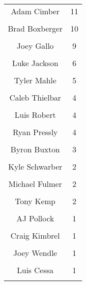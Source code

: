 \begin{table}
\begin{tabular}[t]{|>{}c|>{}c|}
\hline
\cellcolor{gray!6}{Freddy Peralta} & \cellcolor{gray!6}{12}\\
\hline
Adam Cimber & 11\\
\hline
\cellcolor{gray!6}{Julio Urias} & \cellcolor{gray!6}{11}\\
\hline
Brad Boxberger & 10\\
\hline
\cellcolor{gray!6}{Harrison Bader} & \cellcolor{gray!6}{10}\\
\hline
Joey Gallo & 9\\
\hline
\cellcolor{gray!6}{Bryce Harper} & \cellcolor{gray!6}{8}\\
\hline
Luke Jackson & 6\\
\hline
\cellcolor{gray!6}{Teoscar Hernandez} & \cellcolor{gray!6}{6}\\
\hline
Tyler Mahle & 5\\
\hline
\cellcolor{gray!6}{C.J. Cron} & \cellcolor{gray!6}{4}\\
\hline
Caleb Thielbar & 4\\
\hline
\cellcolor{gray!6}{JT Chargois} & \cellcolor{gray!6}{4}\\
\hline
Luis Robert & 4\\
\hline
\cellcolor{gray!6}{Mark Melancon} & \cellcolor{gray!6}{4}\\
\hline
Ryan Pressly & 4\\
\hline
\cellcolor{gray!6}{Salvador Perez} & \cellcolor{gray!6}{4}\\
\hline
Byron Buxton & 3\\
\hline
\cellcolor{gray!6}{Jeimer Candelario} & \cellcolor{gray!6}{3}\\
\hline
Kyle Schwarber & 2\\
\hline
\cellcolor{gray!6}{Michael A. Taylor} & \cellcolor{gray!6}{2}\\
\hline
Michael Fulmer & 2\\
\hline
\cellcolor{gray!6}{Starling Marte} & \cellcolor{gray!6}{2}\\
\hline
Tony Kemp & 2\\
\hline
\cellcolor{gray!6}{Adam Engel} & \cellcolor{gray!6}{1}\\
\hline
AJ Pollock & 1\\
\hline
\cellcolor{gray!6}{Buster Posey} & \cellcolor{gray!6}{1}\\
\hline
Craig Kimbrel & 1\\
\hline
\cellcolor{gray!6}{Frankie Montas} & \cellcolor{gray!6}{1}\\
\hline
Joey Wendle & 1\\
\hline
\cellcolor{gray!6}{Jorge Polanco} & \cellcolor{gray!6}{1}\\
\hline
Luis Cessa & 1\\
\hline
\cellcolor{gray!6}{Max Scherzer} & \cellcolor{gray!6}{1}\\
\hline
\end{tabular}
\end{table}
